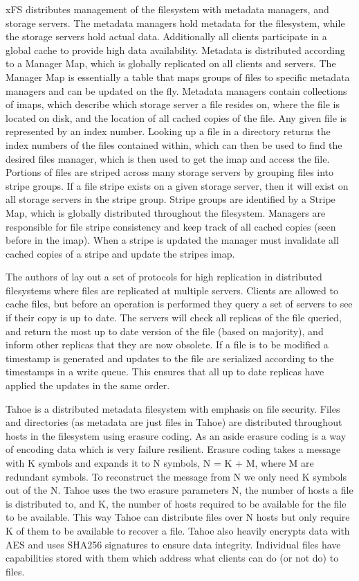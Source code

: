 xFS \cite{Anderson1996} distributes management of the filesystem with metadata
managers, and storage servers. The metadata managers hold metadata for the
filesystem, while the storage servers hold actual data. Additionally all
clients participate in a global cache to provide high data availability.
Metadata is distributed according to a Manager Map, which is globally
replicated on all clients and servers. The Manager Map is essentially a table
that maps groups of files to specific metadata managers and can be updated on
the fly. Metadata managers contain collections of imaps, which describe which
storage server a file resides on, where the file is located on disk, and the
location of all cached copies of the file. Any given file is represented by an
index number. Looking up a file in a directory returns the index numbers of
the files contained within, which can then be used to find the desired files
manager, which is then used to get the imap and access the file. Portions of
files are striped across many storage servers by grouping files into stripe
groups. If a file stripe exists on a given storage server, then it will exist
on all storage servers in the stripe group. Stripe groups are identified by a
Stripe Map, which is globally distributed throughout the filesystem. Managers
are responsible for file stripe consistency and keep track of all cached
copies (seen before in the imap). When a stripe is updated the manager must
invalidate all cached copies of a stripe and update the stripes imap.


The authors of \cite{Triantafillou1997} lay out a set of protocols for high
replication in distributed filesystems where files are replicated at multiple
servers. Clients are allowed to cache files, but before an operation is
performed they query a set of servers to see if their copy is up to date. The
servers will check all replicas of the file queried, and return the most up to
date version of the file (based on majority), and inform other replicas that
they are now obsolete. If a file is to be modified a timestamp is generated
and updates to the file are serialized according to the timestamps in a write
queue.  This ensures that all up to date replicas have applied the updates in
the same order.


Tahoe \cite{Wilcox-O'Hearn2008} is a distributed metadata filesystem with
emphasis on file security. Files and directories (as metadata are just files
in Tahoe) are distributed throughout hosts in the filesystem using erasure
coding. As an aside erasure coding is a way of encoding data which is very
failure resilient. Erasure coding takes a message with K symbols and expands
it to N symbols, N = K + M, where M are redundant symbols. To reconstruct the
message from N we only need K symbols out of the N.  Tahoe uses the two
erasure parameters N, the number of hosts a file is distributed to, and K, the
number of hosts required to be available for the file to be available. This
way Tahoe can distribute files over N hosts but only require K of them to be
available to recover a file. Tahoe also heavily encrypts data with AES and
uses SHA256 signatures to ensure data integrity. Individual files have
capabilities stored with them which address what clients can do (or not do) to
files.

